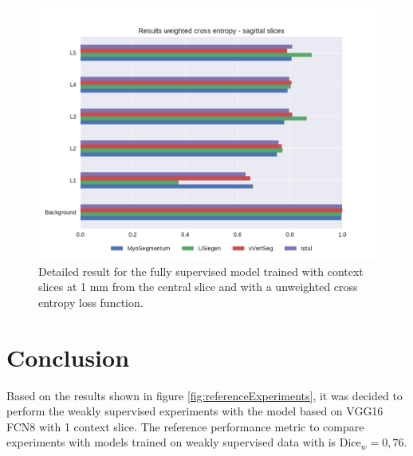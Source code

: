 \begin{figure}
    \centering
    \includegraphics[width=.95\textwidth]{images/full_perClass_perSource_notweighted.pdf}
    \caption{Detailed result for the fully supervised model trained with context slices at 1 mm from the central slice and with a unweighted cross entropy loss function.
    \label{fig:referencenonWeighted}}
\end{figure}



\section{Conclusion}
\par{
    Based on the results shown in figure \ref{fig:referenceExperiments}, it was decided to perform the weakly supervised experiments with the model based on VGG16 FCN8 with 1 context slice.
    The reference performance metric to compare experiments with models trained on weakly supervised data with is $\text{Dice}_w=0,76$.
}
